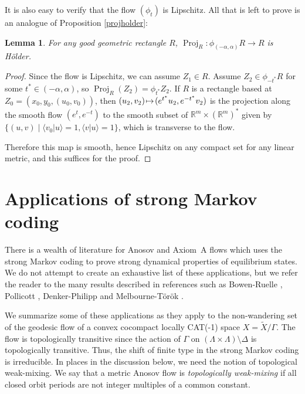 \documentclass[10pt]{amsart}
\let\sep\mid
\def\mto{\mathchoice{\longmapsto}{\mapsto}{\mapsto}{\mapsto}}
\newtheorem{lem}[thm]{Lemma}
\theoremstyle{definition}
\numberwithin{equation}{section}
\DeclareMathOperator{\Proj}{Proj}
\begin{document}
It is also easy to verify that the flow $(\phi_t)$ is Lipschitz. All that is left to prove is an analogue of Proposition \ref{projholder}:

\begin{lem}
For any good geometric rectangle $R$, $\Proj_R:\phi_{(-\alpha,\alpha)} R \to R$ is Hölder.
\end{lem}

\begin{proof}
Since the flow is Lipschitz, we can assume $Z_1\!\in\! R$. Assume $Z_2 \!\in\! \phi_{-t^*}R$ for some $t^* \!\in\! (-\alpha, \alpha)$, so $\Proj_R(Z_2) \!=\! \phi_{t^*}Z_2$. If $R$ is a rectangle based at $Z_0\!=\!(x_0,y_0,(u_0,v_0))$, then $(u_2, v_2)\!\mto\! (e^{t^*}u_2, e^{-t^*}v_2)$ is the projection along the smooth flow $(e^t, e^{-t})$ to the smooth subset of $\mathbb{R}^m\!\times\! (\mathbb{R}^m)^*$ given by \hbox{$\{(u,v)\sep \langle v_0 | u \rangle \!=\!1, \langle v|u \rangle \!=\!1\}$}, which is transverse to the flow. \newpage

Therefore this map is smooth, hence Lipschitz on any compact set for any linear metric, and this suffices for the proof.
\end{proof}

\section{Applications of strong Markov coding}\label{s.applications}

There is a wealth of literature for Anosov and Axiom~A flows which uses the strong Markov coding to prove strong dynamical properties of equilibrium states. We do not attempt to create an exhaustive list of these applications, but we refer the reader to the many results described in references such as Bowen-Ruelle \cite{bowen-ruelle}, Pollicott \cite{pollicott}, Denker-Philipp \cite{DP84} and Melbourne-Török \cite{MT04}.

We summarize some of these applications as they apply to the non-wandering set of the geodesic flow of a convex cocompact locally CAT(-1) space $X = \tilde X/\Gamma$. The flow is topologically transitive since the action of $\Gamma$ on $(\Lambda \times \Lambda)\setminus \Delta$ is topologically transitive. Thus, the shift of finite type in the strong Markov coding is irreducible. In places in the discussion below, we need the notion of topological weak-mixing. We say that a metric Anosov flow is \emph{topologically weak-mixing} if all closed orbit periods are not integer multiples of a common constant.
\end{document}
